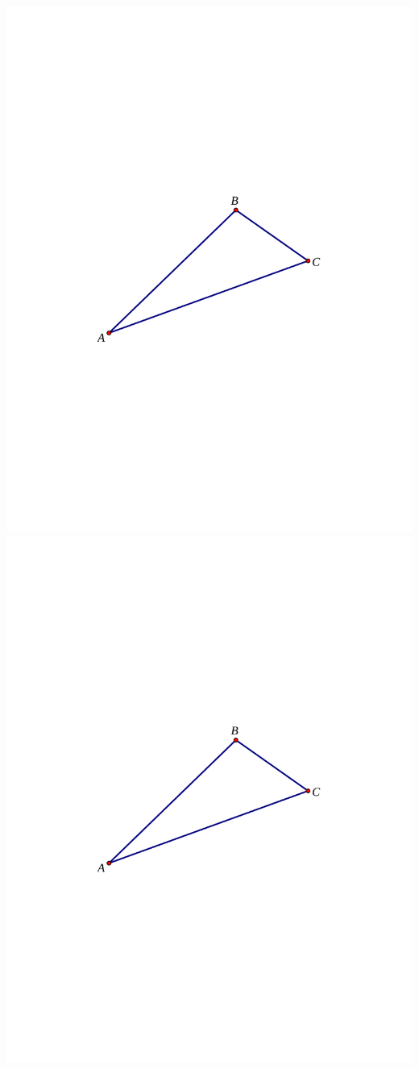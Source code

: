 \vfill
\begin{fullwidth}
\includegraphics[scale=0.9]{../graphics/obtuseTriangle.pdf}
\includegraphics[scale=0.9]{../graphics/obtuseTriangle.pdf}
\end{fullwidth}

\vfill
